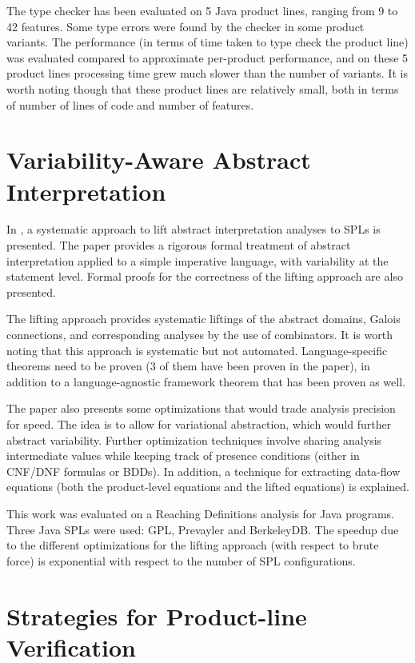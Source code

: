 \documentclass[11pt]{article}
\begin{document}
The type checker has been evaluated on 5 Java product lines, ranging from 9 to 42 features. Some type errors were found by the checker in some product variants. The performance (in terms of time taken to type check the product line) was evaluated compared to approximate per-product performance, and on these 5 product lines processing time grew much slower than the number of variants. It is worth noting though that these product lines are relatively small, both in terms of number of lines of code and number of features. 

\section{Variability-Aware Abstract Interpretation}

In \cite{Midtgaard:2015}, a systematic approach to lift abstract interpretation analyses to SPLs is presented. The paper provides a rigorous  formal treatment of abstract interpretation applied to a simple imperative language, with variability at the statement level. Formal proofs for the correctness of the lifting approach are also presented. 

The lifting approach provides systematic liftings of the abstract domains, Galois connections, and corresponding analyses by the use of combinators. It is worth noting that this approach is systematic but not automated. Language-specific theorems need to be proven (3 of them have been proven in the paper), in addition to a language-agnostic framework theorem that has been proven as well. 

The paper also presents some optimizations that would trade analysis precision for speed. The idea is to allow for variational abstraction, which would further abstract variability. Further optimization techniques involve sharing analysis intermediate values while keeping track of presence conditions (either in CNF/DNF formulas or BDDs). In addition, a technique for extracting data-flow equations (both the product-level equations and the lifted equations) is explained.  

This work was evaluated on a Reaching Definitions analysis for Java programs. Three Java SPLs were used: GPL, Prevayler and BerkeleyDB. The speedup due to the different optimizations for the lifting approach (with respect to brute force) is exponential with respect to the number of SPL configurations.

\section{Strategies for Product-line Verification}
\end{document}
